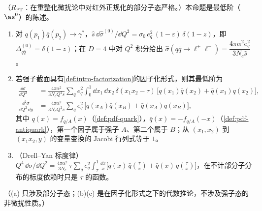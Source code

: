 \begin{proposition}\label{prop:dy-born}
（$R_{\mathrm{PT}}$：在重整化微扰论中对红外正规化的部分子态严格。）本命题是最低阶（$\as^0$）的陈述。
\begin{enumerate}[label=(\alph*),leftmargin=2.2em,itemsep=1pt,topsep=2pt]
\item 对 $q(p_1)\bar q(p_2)\to\gamma^*$，$\hat s\,\dd\hat\sigma^{(0)}/\dd Q^2=\sigma_0\,e_q^2\,(1-\varepsilon)\,\delta(1-z)$，即 $\Delta^{(0)}_{q\bar q}=\delta(1-z)$；在 $D=4$ 中对 $Q^2$ 积分给出 $\hat\sigma(q\bar q\to\ell^+\ell^-)=\dfrac{4\pi\alpha^2e_q^2}{3N_c\hat s}$。
\item 若强子截面具有\cref{def:intro-factorization}的因子化形式，则其最低阶为
\begin{align}
\frac{\dd\sigma}{\dd Q^2}&=\frac{4\pi\alpha^2}{3N_cQ^2s}\sum_qe_q^2\int_0^1\!\dd x_1\,\dd x_2\,\delta(x_1x_2-\tau)\,\big[q(x_1)\bar q(x_2)+\bar q(x_1)q(x_2)\big],\label{eq:dy-LO}\\
\frac{\dd^2\sigma}{\dd Q^2\,\dd y}&=\frac{4\pi\alpha^2}{3N_cQ^2s}\sum_qe_q^2\,\big[q(x_A)\bar q(x_B)+\bar q(x_A)q(x_B)\big],\label{eq:dy-LOy}
\end{align}
其中 $q(x)=f_{q/A}(x)$（\cref{def:pdf-quark}），$\bar q(x)=-f_{q/A}(-x)$（\cref{def:pdf-antiquark}），第一个因子属于强子 $A$、第二个属于 $B$；从 $(x_1,x_2)$ 到 $(x_1x_2,y)$ 的变量变换的 Jacobi 行列式等于 $1$。
\item （Drell--Yan 标度律）$Q^4\,\dd\sigma/\dd Q^2=\frac{4\pi\alpha^2}{3N_c}\,\tau\sum_qe_q^2\int_\tau^1\frac{\dd x}{x}\big[q(x)\,\bar q(\tfrac\tau x)+\bar q(x)\,q(\tfrac\tau x)\big]$，在不计部分子分布的标度依赖时只是 $\tau$ 的函数。
\end{enumerate}
（(a) 只涉及部分子态；(b)(c) 是在因子化形式之下的代数推论，不涉及强子态的非微扰性质。）
\end{proposition}

